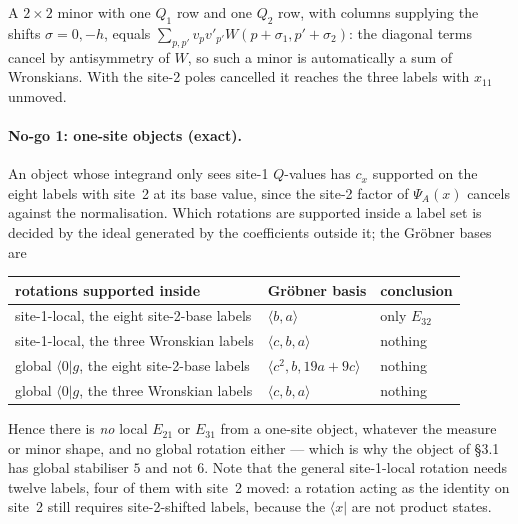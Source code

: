\documentclass[11pt]{article}
\newcommand{\bra}[1]{\langle #1|}
\newcommand{\vac}{\langle 0|}
\begin{document}
A $2\times2$ minor with one $Q_1$ row and one $Q_2$ row, with columns supplying the shifts
$\sigma=0,-h$, equals $\sum_{p,p'}v_pv'_{p'}W(p+\sigma_1,p'+\sigma_2)$: the diagonal terms cancel by
antisymmetry of $W$, so such a minor is automatically a sum of Wronskians. With the site-2 poles
cancelled it reaches the three labels with $x_{11}$ unmoved.

\paragraph{No-go 1: one-site objects (exact).} An object whose integrand only sees site-1
$Q$-values has $c_x$ supported on the eight labels with site~2 at its base value, since the site-2
factor of $\Psi_A(x)$ cancels against the normalisation. Which rotations are supported inside a label
set is decided by the ideal generated by the coefficients outside it; the Gr\"obner bases are
\begin{center}
\begin{tabular}{lll}
\toprule
rotations supported inside & Gr\"obner basis & conclusion\\
\midrule
site-1-local, the eight site-2-base labels & $\langle b,a\rangle$ & only $E_{32}$\\
site-1-local, the three Wronskian labels & $\langle c,b,a\rangle$ & nothing\\
global $\vac g$, the eight site-2-base labels & $\langle c^2,b,19a+9c\rangle$ & nothing\\
global $\vac g$, the three Wronskian labels & $\langle c,b,a\rangle$ & nothing\\
\bottomrule
\end{tabular}
\end{center}
Hence there is \emph{no} local $E_{21}$ or $E_{31}$ from a one-site object, whatever the measure or
minor shape, and no global rotation either --- which is why the object of \S3.1 has global stabiliser
$5$ and not $6$. Note that the general site-1-local rotation needs twelve labels, four of them with
site~2 moved: a rotation acting as the identity on site~2 still requires site-2-shifted labels,
because the $\bra{x}$ are not product states.
\end{document}

